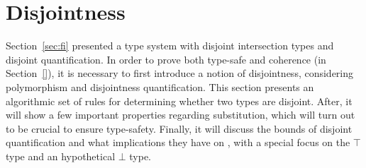 \section{Disjointness} \label{sec:alg-dis}

Section~\ref{sec:fi} presented a type system with disjoint
intersection types and disjoint quantification. In order to prove 
both type-safe and coherence (in Section~\ref{}), it is necessary to first introduce a
notion of disjointness, considering polymorphism and disjointness quantification.
This section presents an algorithmic set of rules for determining whether two types are disjoint. 
After, it will show a few important properties regarding substitution, which will turn out
to be crucial to ensure type-safety.
Finally, it will discuss the bounds of disjoint quantification and what implications
they have on \name, with a special focus on the $\top$ type and an hypothetical $\bot$ type.

